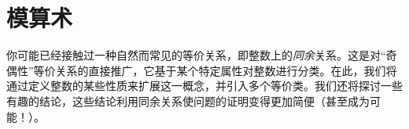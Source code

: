 \section{模算术}

你可能已经接触过一种自然而常见的等价关系，即整数上的\emph{同余}关系。这是对``奇偶性''等价关系的直接推广，它基于某个特定属性对整数进行分类。在此，我们将通过定义整数的某些性质来扩展这一概念，并引入多个等价类。我们还将探讨一些有趣的结论，这些结论利用同余关系使问题的证明变得更加简便（甚至成为可能！）。









